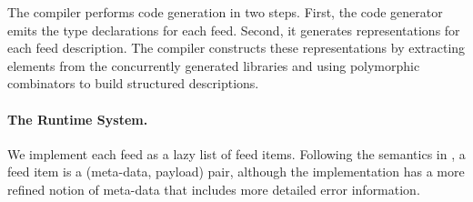 The  compiler performs code generation in two steps.
First, the code generator emits the
type declarations for each feed.  
Second, it generates representations for each feed description.  
The compiler constructs these representations
by extracting elements from the concurrently
generated \padsml{} libraries
and using polymorphic combinators to build structured 
descriptions.  

\paragraph*{The Runtime System.}
We implement each \padsd{} feed as a lazy list of feed items. 
Following the semantics in , 
a feed item is a (meta-data, payload) pair, 
although the implementation has a more refined notion of meta-data
that includes more detailed error information.



